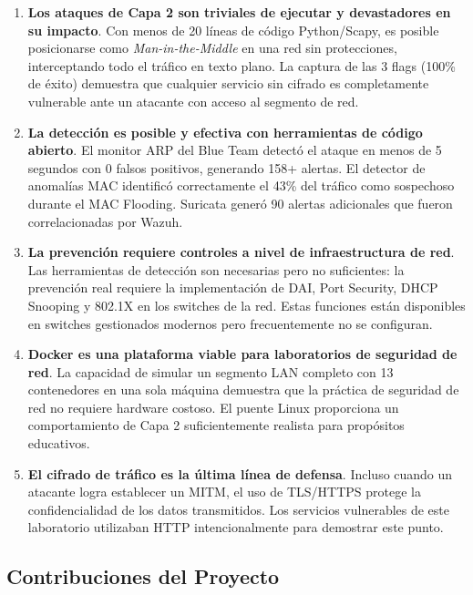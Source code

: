 \documentclass[12pt, a4paper]{article}
\begin{document}
\begin{enumerate}[leftmargin=2cm]
    \item \textbf{Los ataques de Capa 2 son triviales de ejecutar y devastadores en su impacto}. Con menos de 20 l\'ineas de c\'odigo Python/Scapy, es posible posicionarse como \textit{Man-in-the-Middle} en una red sin protecciones, interceptando todo el tr\'afico en texto plano. La captura de las 3 flags (100\% de \'exito) demuestra que cualquier servicio sin cifrado es completamente vulnerable ante un atacante con acceso al segmento de red.

    \item \textbf{La detecci\'on es posible y efectiva con herramientas de c\'odigo abierto}. El monitor ARP del Blue Team detect\'o el ataque en menos de 5 segundos con 0 falsos positivos, generando 158+ alertas. El detector de anomal\'ias MAC identific\'o correctamente el 43\% del tr\'afico como sospechoso durante el MAC Flooding. Suricata gener\'o 90 alertas adicionales que fueron correlacionadas por Wazuh.

    \item \textbf{La prevenci\'on requiere controles a nivel de infraestructura de red}. Las herramientas de detecci\'on son necesarias pero no suficientes: la prevenci\'on real requiere la implementaci\'on de DAI, Port Security, DHCP Snooping y 802.1X en los switches de la red. Estas funciones est\'an disponibles en switches gestionados modernos pero frecuentemente no se configuran.

    \item \textbf{Docker es una plataforma viable para laboratorios de seguridad de red}. La capacidad de simular un segmento LAN completo con 13 contenedores en una sola m\'aquina demuestra que la pr\'actica de seguridad de red no requiere hardware costoso. El puente Linux proporciona un comportamiento de Capa 2 suficientemente realista para prop\'ositos educativos.

    \item \textbf{El cifrado de tr\'afico es la \'ultima l\'inea de defensa}. Incluso cuando un atacante logra establecer un MITM, el uso de TLS/HTTPS protege la confidencialidad de los datos transmitidos. Los servicios vulnerables de este laboratorio utilizaban HTTP intencionalmente para demostrar este punto.
\end{enumerate}

\subsection{Contribuciones del Proyecto}
\end{document}
